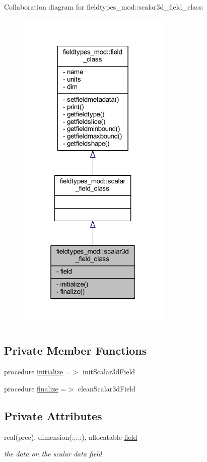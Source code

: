 Collaboration diagram for fieldtypes\+\_\+mod\+:\+:scalar3d\+\_\+field\+\_\+class\+:\nopagebreak
\begin{figure}[H]
\begin{center}
\leavevmode
\includegraphics[width=205pt]{structfieldtypes__mod_1_1scalar3d__field__class__coll__graph}
\end{center}
\end{figure}
\subsection*{Private Member Functions}
\begin{DoxyCompactItemize}
\item 
procedure \mbox{\hyperlink{structfieldtypes__mod_1_1scalar3d__field__class_a17196befda9da8db8f792c933f95a252}{initialize}} =$>$ init\+Scalar3d\+Field
\item 
procedure \mbox{\hyperlink{structfieldtypes__mod_1_1scalar3d__field__class_a03d4eea65560932a072e14355830d43a}{finalize}} =$>$ clean\+Scalar3d\+Field
\end{DoxyCompactItemize}
\subsection*{Private Attributes}
\begin{DoxyCompactItemize}
\item 
real(prec), dimension(\+:,\+:,\+:), allocatable \mbox{\hyperlink{structfieldtypes__mod_1_1scalar3d__field__class_a1fc76fc336c07c0189299ae64fee564f}{field}}
\begin{DoxyCompactList}\small\item\em the data on the scalar data field \end{DoxyCompactList}\end{DoxyCompactItemize}


